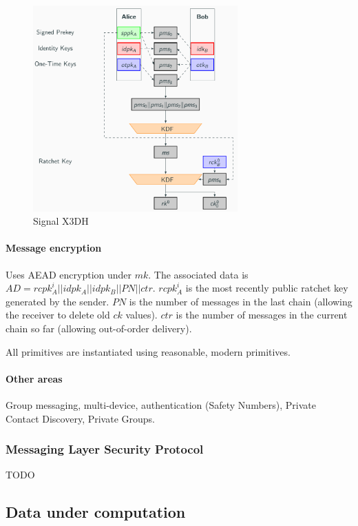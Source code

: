 \begin{figure}[h]
    \centering
	\includegraphics[width=0.7\textwidth]{images/signal-x3dh.png}
    \caption{Signal X3DH}
    \label{fig:signal-x3dh}
\end{figure}

\paragraph{Message encryption}
Uses AEAD encryption under $mk$.
The associated data is \\ $AD=rcpk_A^i || idpk_A || idpk_B || PN || ctr$.
$rcpk_A^i$ is the most recently public ratchet key generated by the sender.
$PN$ is the number of messages in the last chain (allowing the receiver to delete old $ck$ values).
$ctr$ is the number of messages in the current chain so far (allowing out-of-order delivery).

All primitives are instantiated using reasonable, modern primitives.

\paragraph{Other areas}
Group messaging, multi-device, authentication (Safety Numbers),
Private Contact Discovery, Private Groups.


\subsubsection{Messaging Layer Security Protocol}

TODO


\subsection{Data under computation}

